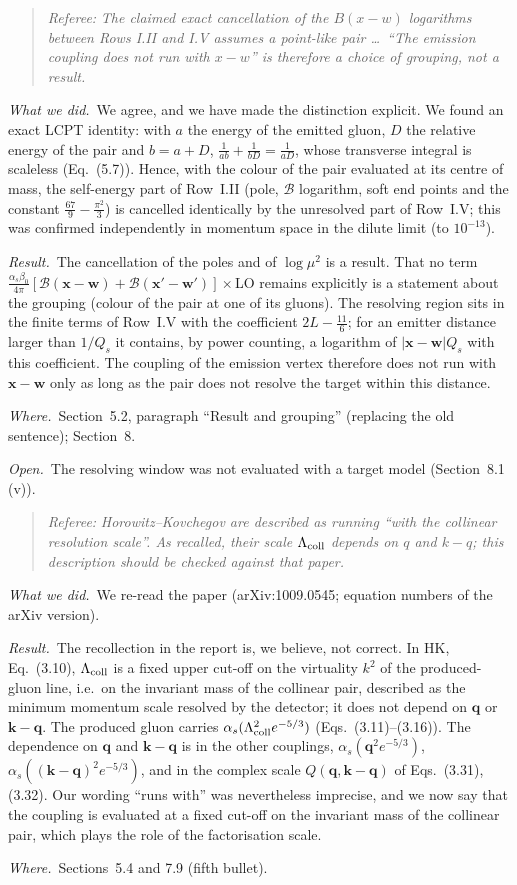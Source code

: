 \documentclass[a4paper,11pt]{article}
\def\v#1{\mathbf{#1}}
\newcommand{\referee}[1]{\begin{quote}\small\emph{Referee:} \emph{#1}\end{quote}}
\newcommand{\done}{\par\noindent\emph{What we did.}\ }
\newcommand{\result}{\par\noindent\emph{Result.}\ }
\newcommand{\where}{\par\noindent\emph{Where.}\ }
\newcommand{\open}{\par\noindent\emph{Open.}\ }
\begin{document}
\referee{The claimed exact cancellation of the $B(x-w)$ logarithms between Rows I.II and I.V assumes a point-like pair \dots\ ``The emission coupling does not run with $x-w$'' is therefore a choice of grouping, not a result.}
\done We agree, and we have made the distinction explicit. We found an exact LCPT identity: with $a$ the energy of the emitted gluon, $D$ the relative energy of the pair and $b=a+D$, $\frac{1}{ab}+\frac{1}{bD}=\frac{1}{aD}$, whose transverse integral is scaleless (Eq.~(5.7)). Hence, with the colour of the pair evaluated at its centre of mass, the self-energy part of Row~I.II (pole, $\mathcal B$ logarithm, soft end points and the constant $\frac{67}{9}-\frac{\pi^2}{3}$) is cancelled identically by the unresolved part of Row~I.V; this was confirmed independently in momentum space in the dilute limit (to $10^{-13}$).
\result The cancellation of the poles and of $\log\mu^2$ is a result. That no term $\frac{\alpha_s\beta_0}{4\pi}[\mathcal B(\v x-\v w)+\mathcal B(\v x'-\v w')]\times$LO remains explicitly is a statement about the grouping (colour of the pair at one of its gluons). The resolving region sits in the finite terms of Row~I.V with the coefficient $2L-\frac{11}{6}$; for an emitter distance larger than $1/Q_s$ it contains, by power counting, a logarithm of $|\v x-\v w|Q_s$ with this coefficient. The coupling of the emission vertex therefore does not run with $\v x-\v w$ only as long as the pair does not resolve the target within this distance.
\where Section~5.2, paragraph ``Result and grouping'' (replacing the old sentence); Section~8.
\open The resolving window was not evaluated with a target model (Section~8.1 (v)).

\referee{Horowitz--Kovchegov are described as running ``with the collinear resolution scale''. As recalled, their scale $\Lambda_{\rm coll}$ depends on $q$ and $k-q$; this description should be checked against that paper.}
\done We re-read the paper (arXiv:1009.0545; equation numbers of the arXiv version).
\result The recollection in the report is, we believe, not correct. In HK, Eq.~(3.10), $\Lambda_{\rm coll}$ is a fixed upper cut-off on the virtuality $k^2$ of the produced-gluon line, i.e.\ on the invariant mass of the collinear pair, described as the minimum momentum scale resolved by the detector; it does not depend on $\v q$ or $\v k-\v q$. The produced gluon carries $\alpha_s(\Lambda^2_{\rm coll}e^{-5/3})$ (Eqs.~(3.11)--(3.16)). The dependence on $\v q$ and $\v k-\v q$ is in the other couplings, $\alpha_s(\v q^2e^{-5/3})$, $\alpha_s((\v k-\v q)^2e^{-5/3})$, and in the complex scale $Q(\v q,\v k-\v q)$ of Eqs.~(3.31), (3.32). Our wording ``runs with'' was nevertheless imprecise, and we now say that the coupling is evaluated at a fixed cut-off on the invariant mass of the collinear pair, which plays the role of the factorisation scale.
\where Sections~5.4 and 7.9 (fifth bullet).
\end{document}
